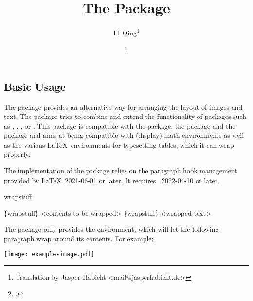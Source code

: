 \documentclass{ctxdoc}
\begin{document}

  \title{\bfseries The  Package}
  \author{LI Qing\thanks{Translation by Jasper Habicht <mail@jasperhabicht.de>}}
  \date{\filedate\qquad\fileversion\thanks{\gitsha{\ExplFileVersion}.}}
  \maketitle

  \begin{documentation}

  \section{Basic Usage}

  The  package provides an alternative way for arranging the layout of images and text.
  The  package tries to combine and extend the functionality of packages such as , , ,
   or .
  This package is compatible with the  package, the  package and the  package and aims at being compatible with (display) math environments as well as the various \LaTeX\ environments for typesetting tables, which it can wrap properly.

  The implementation of the  package relies on the paragraph hook management provided by \LaTeX\ 2021-06-01 or later. It requires \LaTeXiii\ 2022-04-10 or later.

  \begin{function}{wrapstuff}
    \begin{syntax}
      \{wrapstuff\}
        <contents to be wrapped>
      \{wrapstuff\}
      <wrapped text>
    \end{syntax}
    The  package only provides the  environment, which will let the following paragraph wrap around its contents. For example:
    \begin{Example}[frame=single,numbers=none,gobble=5]
      \begin{wrapstuff}[c,top=1]
        \texttt{[image: example-image.pdf]}
      \end{wrapstuff}
      \lipsum[2]
    \end{Example}
  \end{function}


\end{documentation}
\end{document}
